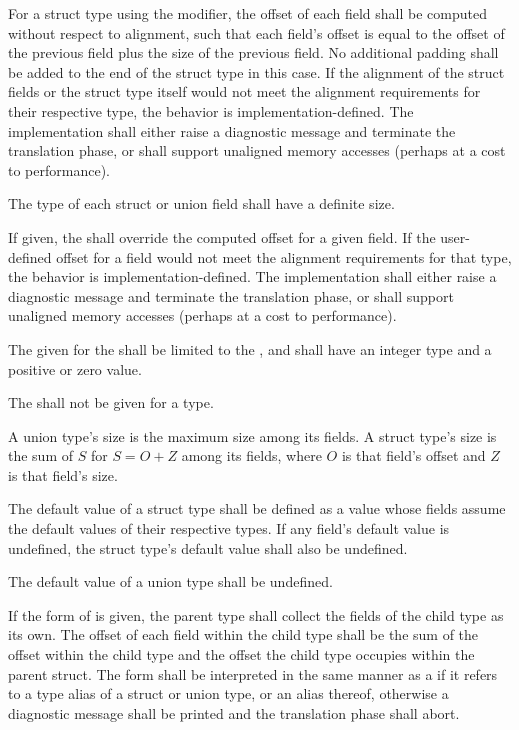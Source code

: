 \specsubsubitem
For a struct type using the  modifier, the offset of each
field shall be computed without respect to alignment, such that each field's
offset is equal to the offset of the previous field plus the size of the
previous field. No additional padding shall be added to the end of the struct
type in this case. If the alignment of the struct fields or the struct type
itself would not meet the alignment requirements for their respective type, the
behavior is implementation-defined. The implementation shall either raise a
diagnostic message and terminate the translation phase, or shall support
unaligned memory accesses (perhaps at a cost to performance).

\specsubsubitem
The type of each struct or union field shall have a definite size.

\specsubsubitem
If given, the  shall override the computed offset
for a given field. If the user-defined offset for a field would not meet the
alignment requirements for that type, the behavior is implementation-defined.
The implementation shall either raise a diagnostic message and terminate the
translation phase, or shall support unaligned memory accesses (perhaps at a
cost to performance).

\specsubsubitem
The  given for the  shall
be limited to the , and
shall have an integer type and a positive or zero value.

\specsubsubitem
The  shall not be given for a 
type.

\specsubsubitem
A union type's size is the maximum size among its fields. A struct type's size
is the sum of $S$ for $S = O+Z$ among its fields, where $O$ is that
field's offset and $Z$ is that field's size.

\specsubsubitem
The default value of a struct type shall be defined as a value whose fields
assume the default values of their respective types. If any field's default
value is undefined, the struct type's default value shall also be undefined.

\specsubsubitem
The default value of a union type shall be undefined.

\specsubsubitem
If the  form of 
is given, the parent type shall collect the fields of the child type as its
own. The offset of each field within the child type shall be the sum of the
offset within the child type and the offset the child type occupies within the
parent struct. The  form shall be interpreted in the same
manner as a  if it refers to a type alias of a
struct or union type, or an alias thereof, otherwise a diagnostic message shall
be printed and the translation phase shall abort.

